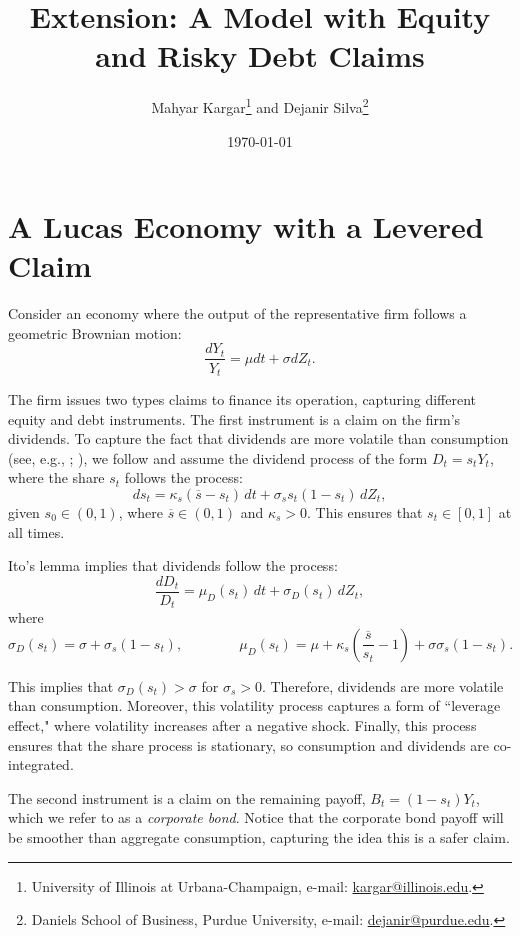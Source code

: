\documentclass[11pt,english]{article}
\title{\textbf{Extension: A Model with Equity and Risky Debt Claims}}
\author{Mahyar Kargar\thanks{University of Illinois at Urbana-Champaign, e-mail: \href{mailto:kargar@illinois.edu}{kargar@illinois.edu}.} and Dejanir Silva\thanks{Daniels School of Business, Purdue University, e-mail: \href{dejanir@purdue.edu}{dejanir@purdue.edu}.}}
\date{\today}
\begin{document}
	\maketitle
	
\section{A Lucas Economy with a Levered Claim}

Consider an economy where the output of the representative firm follows a geometric Brownian motion:
\begin{equation}\label{eq:agg_endow}
    \frac{d Y_t}{Y_t} = \mu dt + \sigma d Z_t.
\end{equation}

The firm issues two types claims to finance its operation, capturing different equity and debt instruments. 
The first instrument is a claim on the firm's dividends. 
To capture the fact that dividends are more volatile than consumption (see, e.g., \citealt{Abel1999LeverageDividends}; \citealt{Campbell1999AssetPrices}), we follow \citet{MenzlySantosVeronesi2004} and assume the dividend process of the form $D_t = s_t Y_t$, where the share $s_t$ follows the process:
\begin{equation}
    d s_t = \kappa_s (\overline{s} - s_t)\, dt + \sigma_s s_t (1-s_t)\, dZ_t,
\end{equation}
given $s_0 \in (0,1)$, where $\overline{s} \in (0,1)$ and $\kappa_s > 0$. This ensures that $s_t \in [0,1]$ at all times. 

Ito's lemma implies that dividends follow the process:
\begin{equation}
    \frac{d D_t}{D_t} = \mu_D(s_t)\, dt + \sigma_D(s_t)\, dZ_t,
\end{equation}
where
\begin{equation}
    \sigma_{D}(s_t) = \sigma + \sigma_s (1-s_t), \qquad \qquad 
    \mu_D(s_t) = \mu + \kappa_s \left( \frac{\overline{s}}{s_t}-1\right) + \sigma \sigma_s(1-s_t).
\end{equation}

This implies that $\sigma_{D}(s_t) > \sigma$ for $\sigma_s > 0$. 
Therefore, dividends are more volatile than consumption. 
Moreover, this volatility process captures a form of ``leverage effect," where volatility increases after a negative shock. 
Finally, this process ensures that the share process is stationary, so consumption and dividends are co-integrated. 

The second instrument is a claim on the remaining payoff, $B_t = (1-s_t) Y_t$, which we refer to as a \textit{corporate bond}.
Notice that the corporate bond payoff will be smoother than aggregate consumption, capturing the idea this is a safer claim.
\end{document}
